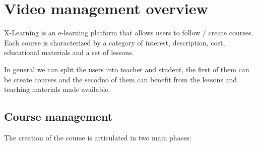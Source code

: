 \section{Video management overview}
\label{sec:Video_management_overview}

X-Learning is an e-learning platform that allows users to follow / create courses.
Each course is characterized by a category of interest, description, cost, educational materials and a set of lessons.

In general we can split the users into teacher and student, the first of them can be create courses and the secodno of them can benefit from the lessons and teaching materials made available.

\subsection{Course management}
\label{sec:course_management}

The creation of the course is articulated in two main phases:

